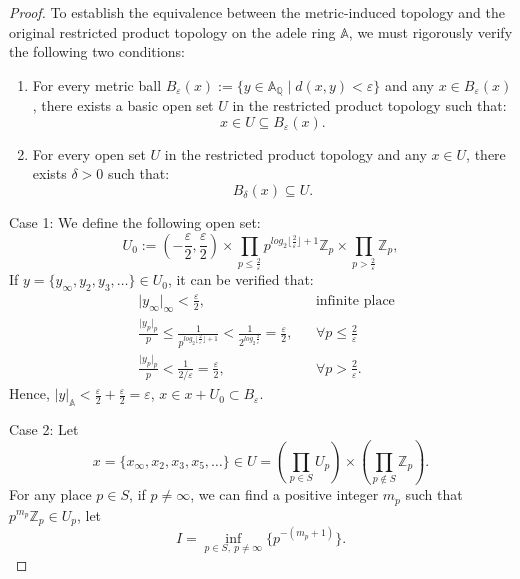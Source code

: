 \documentclass[11pt]{article}
\newcommand{\A}{\mathbb{A}}
\theoremstyle{remark}
\begin{document}
\begin{proof}
To establish the equivalence between the metric-induced topology and the original restricted product topology on the adele ring $\A$, we must rigorously verify the following two conditions: 
\begin{enumerate}
    \item For every metric ball \( B_\varepsilon(x) := \{ y \in \mathbb{A}_{\mathbb{Q}} \mid d(x,y) < \varepsilon \} \) and any \( x \in B_\varepsilon(x) \), there exists a basic open set \( U \) in the restricted product topology such that:
    \[
    x \in U \subseteq B_\varepsilon(x).
    \]
    
    \item For every open set \( U \) in the restricted product topology and any \( x \in U \), there exists \( \delta > 0 \) such that:
    \[
    B_\delta(x) \subseteq U.
    \]
\end{enumerate}
    Case 1: We define the following open set:
    \begin{equation}
        U_0:=(-\frac{\varepsilon}{2},\frac{\varepsilon}{2})\times\prod_{p\leq\frac{2}{\varepsilon}}p^{log_2\lfloor\frac{2}{\varepsilon}\rfloor+1}\mathbb{Z}_p\times\prod_{p>\frac{2}{\varepsilon}}\mathbb{Z}_p,
    \end{equation}
    If $y=\{y_\infty,y_2,y_3,\dots\}\in U_0$, it can be verified that:
\[  
\begin{aligned}
    &\lvert y_\infty\rvert_\infty<\frac{\varepsilon}{2},        && \text{infinite place} \\
    &\frac{\lvert y_p\rvert_p}{p}\leq \frac{1}{p^{log_2\lfloor\frac{2}{\varepsilon}\rfloor+1}}<\frac{1}{2^{log_2\frac{2}{\varepsilon}}}=\frac{\varepsilon}{2},           && \forall p\leq\frac{2}{\varepsilon} \\
    &\frac{\lvert y_p\rvert_p}{p}<\frac{1}{2/\varepsilon}=\frac{\varepsilon}{2},           &&  \forall p>\frac{2}{\varepsilon}.
\end{aligned}
\]  
    Hence, \(\lvert y\rvert_{\A}<\frac{\varepsilon}{2}+\frac{\varepsilon}{2}=\varepsilon\), $x\in x+U_0\subset B_{\varepsilon}$.
    
    Case 2: Let
    \[x=\{x_\infty,x_2,x_3,x_5,\dots\}\in U = \left( \prod_{p \in S} U_p \right) \times \left( \prod_{p \notin S} \mathbb{Z}_p \right).\]
    For any place $p\in S$, if $p\neq\infty$, we can find a positive integer $m_p$ such that $p^{m_p}\mathbb{Z}_p\in U_p$, let
    \[
    I=\inf_{p\in S,\ p\neq \infty}\{p^{-{(m_p+1)}}\}.
    \]
    

\end{proof}
\end{document}
